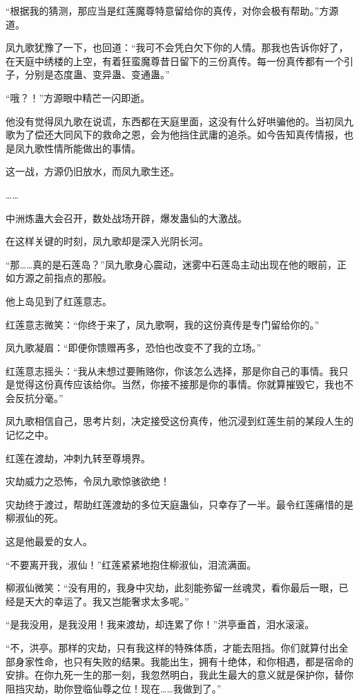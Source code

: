 \begin{this_body}
“根据我的猜测，那应当是红莲魔尊特意留给你的真传，对你会极有帮助。”方源道。

凤九歌犹豫了一下，也回道：“我可不会凭白欠下你的人情。那我也告诉你好了，在天庭中绣楼的上空，有着狂蛮魔尊昔日留下的三份真传。每一份真传都有一个引子，分别是态度蛊、变异蛊、变通蛊。”

“哦？！”方源眼中精芒一闪即逝。

他没有觉得凤九歌在说谎，东西都在天庭里面，这没有什么好哄骗他的。当初凤九歌为了偿还大同风下的救命之恩，会为他挡住武庸的追杀。如今告知真传情报，也是凤九歌性情所能做出的事情。

这一战，方源仍旧放水，而凤九歌生还。

……

中洲炼蛊大会召开，数处战场开辟，爆发蛊仙的大激战。

在这样关键的时刻，凤九歌却是深入光阴长河。

“那……真的是石莲岛？”凤九歌身心震动，迷雾中石莲岛主动出现在他的眼前，正如方源之前指点的那般。

他上岛见到了红莲意志。

红莲意志微笑：“你终于来了，凤九歌啊，我的这份真传是专门留给你的。”

凤九歌凝眉：“即便你馈赠再多，恐怕也改变不了我的立场。”

红莲意志摇头：“我从未想过要贿赂你，你该怎么选择，那是你自己的事情。我只是觉得这份真传应该给你。当然，你接不接那是你的事情。你就算摧毁它，我也不会反抗分毫。”

凤九歌相信自己，思考片刻，决定接受这份真传，他沉浸到红莲生前的某段人生的记忆之中。

红莲在渡劫，冲刺九转至尊境界。

灾劫威力之恐怖，令凤九歌惊骇欲绝！

灾劫终于渡过，帮助红莲渡劫的多位天庭蛊仙，只幸存了一半。最令红莲痛惜的是柳淑仙的死。

这是他最爱的女人。

“不要离开我，淑仙！”红莲紧紧地抱住柳淑仙，泪流满面。

柳淑仙微笑：“没有用的，我身中灾劫，此刻能弥留一丝魂灵，看你最后一眼，已经是天大的幸运了。我又岂能奢求太多呢。”

“是我没用，是我没用！我来渡劫，却连累了你！”洪亭垂首，泪水滚滚。

“不，洪亭。那样的灾劫，只有我这样的特殊体质，才能去阻挡。你们就算付出全部身家性命，也只有失败的结果。我能出生，拥有十绝体，和你相遇，都是宿命的安排。在你九死一生的那一刻，我忽然明白，我此生最大的意义就是保护你，替你阻挡灾劫，助你登临仙尊之位！现在……我做到了。”


\end{this_body}
